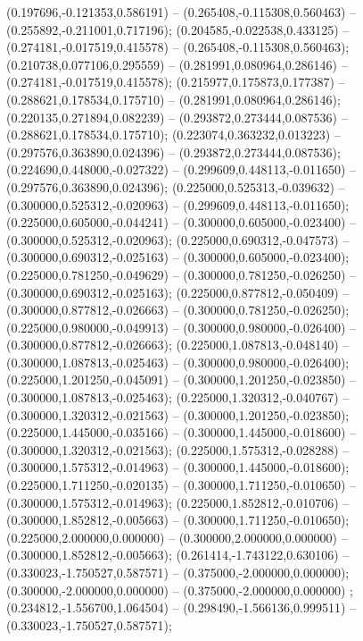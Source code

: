  (0.197696,-0.121353,0.586191) -- (0.265408,-0.115308,0.560463) -- (0.255892,-0.211001,0.717196);
 (0.204585,-0.022538,0.433125) -- (0.274181,-0.017519,0.415578) -- (0.265408,-0.115308,0.560463);
 (0.210738,0.077106,0.295559) -- (0.281991,0.080964,0.286146) -- (0.274181,-0.017519,0.415578);
 (0.215977,0.175873,0.177387) -- (0.288621,0.178534,0.175710) -- (0.281991,0.080964,0.286146);
 (0.220135,0.271894,0.082239) -- (0.293872,0.273444,0.087536) -- (0.288621,0.178534,0.175710);
 (0.223074,0.363232,0.013223) -- (0.297576,0.363890,0.024396) -- (0.293872,0.273444,0.087536);
 (0.224690,0.448000,-0.027322) -- (0.299609,0.448113,-0.011650) -- (0.297576,0.363890,0.024396);
 (0.225000,0.525313,-0.039632) -- (0.300000,0.525312,-0.020963) -- (0.299609,0.448113,-0.011650);
 (0.225000,0.605000,-0.044241) -- (0.300000,0.605000,-0.023400) -- (0.300000,0.525312,-0.020963);
 (0.225000,0.690312,-0.047573) -- (0.300000,0.690312,-0.025163) -- (0.300000,0.605000,-0.023400);
 (0.225000,0.781250,-0.049629) -- (0.300000,0.781250,-0.026250) -- (0.300000,0.690312,-0.025163);
 (0.225000,0.877812,-0.050409) -- (0.300000,0.877812,-0.026663) -- (0.300000,0.781250,-0.026250);
 (0.225000,0.980000,-0.049913) -- (0.300000,0.980000,-0.026400) -- (0.300000,0.877812,-0.026663);
 (0.225000,1.087813,-0.048140) -- (0.300000,1.087813,-0.025463) -- (0.300000,0.980000,-0.026400);
 (0.225000,1.201250,-0.045091) -- (0.300000,1.201250,-0.023850) -- (0.300000,1.087813,-0.025463);
 (0.225000,1.320312,-0.040767) -- (0.300000,1.320312,-0.021563) -- (0.300000,1.201250,-0.023850);
 (0.225000,1.445000,-0.035166) -- (0.300000,1.445000,-0.018600) -- (0.300000,1.320312,-0.021563);
 (0.225000,1.575312,-0.028288) -- (0.300000,1.575312,-0.014963) -- (0.300000,1.445000,-0.018600);
 (0.225000,1.711250,-0.020135) -- (0.300000,1.711250,-0.010650) -- (0.300000,1.575312,-0.014963);
 (0.225000,1.852812,-0.010706) -- (0.300000,1.852812,-0.005663) -- (0.300000,1.711250,-0.010650);
 (0.225000,2.000000,0.000000) -- (0.300000,2.000000,0.000000) -- (0.300000,1.852812,-0.005663);
 (0.261414,-1.743122,0.630106) -- (0.330023,-1.750527,0.587571) -- (0.375000,-2.000000,0.000000);
 (0.300000,-2.000000,0.000000) -- (0.375000,-2.000000,0.000000) ;
 (0.234812,-1.556700,1.064504) -- (0.298490,-1.566136,0.999511) -- (0.330023,-1.750527,0.587571);

